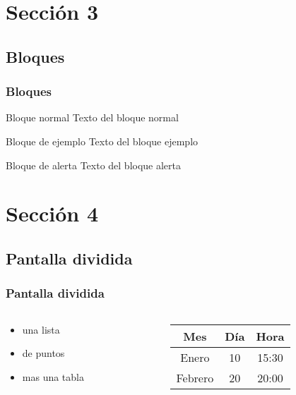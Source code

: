 \documentclass{beamer}
\begin{document}
\section{Sección 3}
\subsection{Bloques}

\begin{frame}
\frametitle{Bloques}

\begin{block}{Bloque normal}
Texto del bloque normal
\end{block}

\begin{exampleblock}{Bloque de ejemplo}
Texto del bloque ejemplo
\end{exampleblock}

\begin{alertblock}{Bloque de alerta}
Texto del bloque alerta
\end{alertblock}
\end{frame}

\section{Sección 4}
\subsection{Pantalla dividida}

\begin{frame}
\frametitle{Pantalla dividida}
\begin{columns}
\begin{column}{5cm}
\begin{itemize}
\item una lista
\item de puntos 
\item mas una tabla 
\end{itemize}
\end{column}
\begin{column}{5cm}
\begin{tabular}{|c|c|c|} \hline
\textbf{Mes} & \textbf{Día} & \textbf{Hora} \\ \hline
Enero   & 10 & 15:30 \\ \hline
Febrero & 20 & 20:00 \\ \hline
\end{tabular}
\end{column}
\end{columns}
\end{frame}
\end{document}
